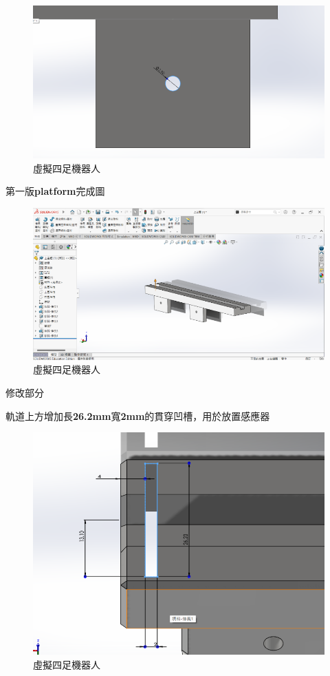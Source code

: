 \begin{figure}[h!]
    \centering
    \includegraphics[width=1\textwidth]{./../images/6-1-18.png}
    \caption{\Large 虛擬四足機器人}
\end{figure}

\noindent 第一版\textbf{platform}完成圖

\begin{figure}[h!]
    \centering
    \includegraphics[width=1\textwidth]{./../images/6-1-19.png}
    \caption{\Large 虛擬四足機器人}
\end{figure}

\noindent 修改部分

\noindent 軌道上方增加長\textbf{26.2mm}寬\textbf{2mm}的貫穿凹槽，用於放置感應器

\begin{figure}[h!]
    \centering
    \includegraphics[width=1\textwidth]{./../images/6-1-20.png}
    \caption{\Large 虛擬四足機器人}
\end{figure}

